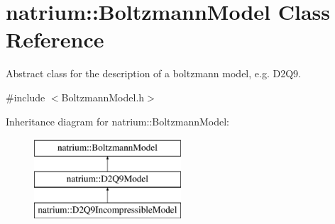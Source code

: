 \hypertarget{classnatrium_1_1BoltzmannModel}{\section{natrium\-:\-:\-Boltzmann\-Model \-Class \-Reference}
\label{classnatrium_1_1BoltzmannModel}
}


\-Abstract class for the description of a boltzmann model, e.\-g. \-D2\-Q9.  




{\ttfamily \#include $<$\-Boltzmann\-Model.\-h$>$}

\-Inheritance diagram for natrium\-:\-:\-Boltzmann\-Model\-:\begin{figure}[H]
\begin{center}
\leavevmode
\includegraphics[height=3.000000cm]{classnatrium_1_1BoltzmannModel}
\end{center}
\end{figure}
